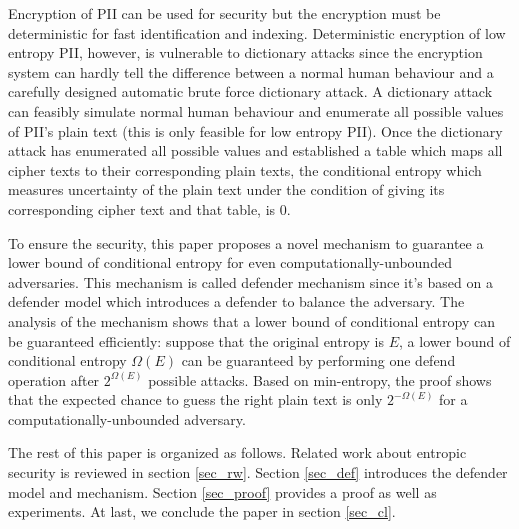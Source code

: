 \documentclass[10pt, conference, compsocconf]{IEEEtran}
\begin{document}
    Encryption of PII can be used for security but
    the encryption must be deterministic for fast identification and indexing.
    Deterministic encryption of low entropy PII, however, is
    vulnerable to dictionary attacks since the encryption system can hardly tell
    the difference between a normal human behaviour and a carefully
    designed automatic brute force dictionary attack. A dictionary
    attack can feasibly simulate normal human behaviour and enumerate all
    possible values of PII's plain text (this is only feasible for low entropy PII).
    Once the dictionary attack has enumerated all possible values
    and established a table which maps all cipher texts
    to their corresponding plain texts, the conditional entropy \cite{math_book, info_measure}
    which measures uncertainty of the plain text under the condition of giving
    its corresponding cipher text and that table, is $0$.

    To ensure the security,
    this paper proposes a novel mechanism to guarantee a
    lower bound of conditional entropy for even computationally-unbounded
    adversaries. This mechanism is called defender mechanism
    since it's based on a defender model which introduces
    a defender to balance the adversary.
    The analysis of the mechanism shows that a lower bound
    of conditional entropy can be guaranteed efficiently: suppose that the original entropy
    is $E$, a lower bound of conditional entropy $\Omega(E)$ can be guaranteed
    by performing one defend operation after $2^{\Omega(E)}$
    possible attacks. Based on min-entropy, the proof shows that
    the expected chance to guess the right plain text is only $2^{-\Omega(E)}$ for
    a computationally-unbounded adversary.


    The rest of this paper is organized as follows.
    Related work about entropic security
    is reviewed in section \ref{sec_rw}.
    Section \ref{sec_def} introduces the defender model and mechanism.
    Section \ref{sec_proof} provides a proof as well as experiments.
    At last, we conclude the paper in section \ref{sec_cl}.
\end{document}
